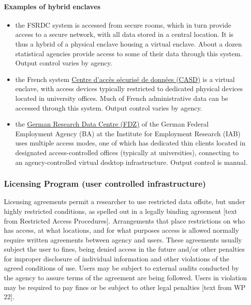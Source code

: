 \paragraph{Examples of hybrid enclaves}
\begin{itemize}
    \item the FSRDC system is accessed from secure rooms, which in turn provide access to a secure network, with all data stored in a central location. It is thus a hybrid of a physical enclave housing a virtual enclave. About a dozen statistical agencies provide access to some of their data through this system. Output control varies by agency.
    \item the French system \href{https://casd.eu}{Centre d'acc\`es s\'ecuris\'e de donn\'ees (CASD)} is a virtual enclave, with access devices typically restricted to dedicated physical devices located in university offices. Much of French administrative data can be accessed through this system. Output control varies by agency.
    \item the \href{https://fdz.iab.de/}{German Research Data Centre (FDZ)} of the German Federal Employment Agency (BA) at the Institute for Employment Research (IAB) uses multiple access modes, one of which has dedicated thin clients located in designated access-controlled offices (typically at universities), connecting to an agency-controlled virtual desktop infrastructure. Output control is manual.
\end{itemize}

\subsubsection{Licensing Program (user controlled infrastructure)}

Licensing agreements permit a researcher to use restricted data offsite, but under highly restricted
conditions, as spelled out in a legally binding agreement [text from Restricted Access Procedures]. Arrangements that place restrictions on who has access, at what locations, and for what purposes access is allowed normally require written agreements between agency and users. These agreements usually subject the user to fines, being denied access in the future and/or other penalties for improper disclosure of individual information and other violations of the agreed conditions of use. Users may be subject to external audits conducted by the agency to assure terms of the agreement are being followed. Users in violation may be required to pay fines or be subject to other legal penalties [text from WP 22].

